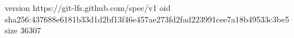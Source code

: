 version https://git-lfs.github.com/spec/v1
oid sha256:437688e6181b33d1d2bf13f46e457ae273fd2fad223991cee7a18b49533c3be5
size 36307
